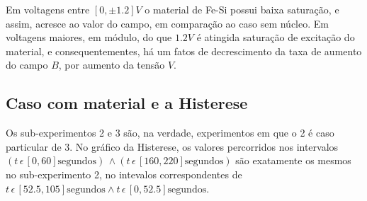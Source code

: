 \documentclass[11pt]{article}
\begin{document}
Em voltagens entre \([0, \pm 1.2]V\) o material de Fe-Si possui baixa saturação, e assim, acresce ao valor do campo, em comparação ao caso sem núcleo. Em voltagens maiores, em módulo, do que \(1.2V\) é atingida saturação de excitação do material, e consequentementes, há um fatos de decrescimento da taxa de aumento do campo \(B\), por aumento da tensão \(V\).

\subsection{Caso com material e a Histerese}
\label{sec:org7fd1a0b}

Os sub-experimentos 2 e 3 são, na verdade, experimentos em que o 2 é caso particular de 3. No gráfico da Histerese, os valores percorridos nos intervalos \((t \, \epsilon \, [0, 60] \textrm{segundos}) \, \land (t \, \epsilon \, [160, 220] \textrm{segundos})\) são exatamente os mesmos no sub-experimento 2, no intevalos correspondentes de \(t \, \epsilon \, [52.5, 105] \textrm{segundos} \land t \, \epsilon \, [0, 52.5] \textrm{segundos}\).
\end{document}
